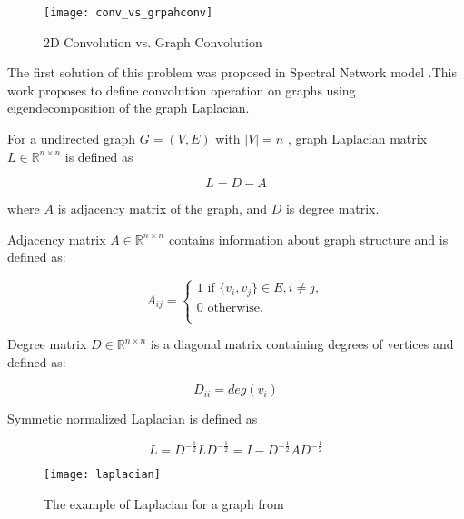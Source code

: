 \begin{figure}[t]
    \centering
    \texttt{[image: conv\_vs\_grpahconv]}
    \caption{2D Convolution vs. Graph Convolution \cite{SurveyOnGNN}}
    \label{fig:conv}
\end{figure}

The first solution of this problem was proposed in Spectral Network model \cite{Spectral}.This work proposes
to define convolution operation on graphs using eigendecomposition of the graph Laplacian.

For a undirected graph $G = (V,E)$ with $|V|=n$ , graph Laplacian matrix  $L \in \mathbb{R}^{n \times n}$ is defined as 

\begin{equation}
    L = D - A
    \label{eq:laplacian}
 \end{equation}

where $A$ is adjacency matrix of the graph, and $D$ is degree matrix.

Adjacency matrix $A \in \mathbb{R}^{n \times n}$ contains information about graph structure and is defined as:

\begin{equation}
    A_{ij} = 
    \begin{cases}
        1 \text{ if } \{v_i, v_j \} \in E, i \neq j,\\
        0 \text{ otherwise},\\
    \end{cases}
    \label{eq:adj}
\end{equation}

Degree matrix $D \in \mathbb{R}^{n \times n}$ is a diagonal matrix containing degrees of vertices and defined as:

\begin{equation}
    D_{ii} = deg(v_i)
    \label{eq:deg_mat}
 \end{equation}


Symmetic normalized Laplacian is defined as 

\begin{equation}
    L = D^{-\frac{1}{2}}LD^{-\frac{1}{2}} = I - D^{-\frac{1}{2}}AD^{-\frac{1}{2}}
    \label{eq:normalized_laplacian}
 \end{equation}

\begin{figure}[t]
    \centering
    \texttt{[image: laplacian]}
    \caption{The example of Laplacian for a graph from \cite{distillGCN}}
    \label{fig:laplacian}
\end{figure}

